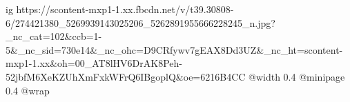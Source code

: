  
 
 
 
 

\ifcmt
  ig https://scontent-mxp1-1.xx.fbcdn.net/v/t39.30808-6/274421380_5269939143025206_5262891955666228245_n.jpg?_nc_cat=102&ccb=1-5&_nc_sid=730e14&_nc_ohc=D9CRfywv7gEAX8Dd3UZ&_nc_ht=scontent-mxp1-1.xx&oh=00_AT8lHV6DrAK8Peh-52jbfM6XeKZUhXmFxkWFrQ6IBgoplQ&oe=6216B4CC
  @width 0.4
  @minipage 0.4
  @wrap \parpic[r]
\fi
